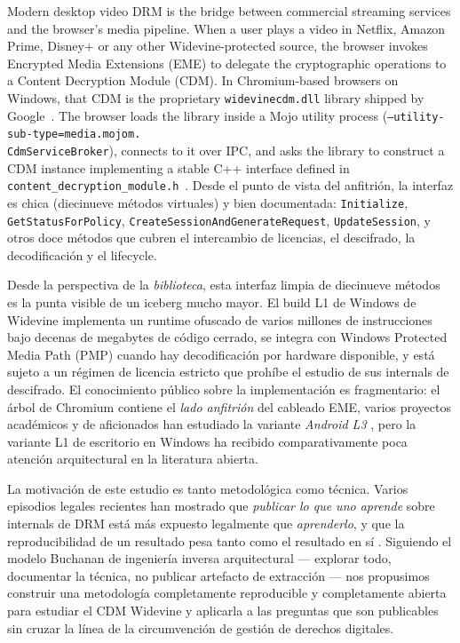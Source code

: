 \documentclass[11pt,letterpaper]{article}
\begin{document}
Modern desktop video DRM is the bridge between commercial streaming
services and the browser's media pipeline. When a user plays a video
in Netflix, Amazon Prime, Disney+ or any other Widevine-protected
source, the browser invokes Encrypted Media Extensions (EME) to
delegate the cryptographic operations to a Content Decryption Module
(CDM). In Chromium-based browsers on Windows, that CDM is the
proprietary \texttt{widevinecdm.dll} library shipped by
Google~\cite{widevine-spec}. The browser loads the library inside a
Mojo utility process
(\texttt{--utility-sub-type=media.mojom.\\CdmServiceBroker}), connects
to it over IPC, and asks the library to construct a CDM instance
implementing a stable C++ interface defined in
\texttt{content\_decryption\_module.h}~\cite{chromium-cdm-api}.
Desde el punto de vista del anfitrión, la interfaz es chica
(diecinueve métodos virtuales) y bien documentada:
\texttt{Initialize}, \texttt{GetStatusForPolicy},
\texttt{CreateSessionAndGenerateRequest},
\texttt{UpdateSession}, y otros doce métodos que cubren el
intercambio de licencias, el descifrado, la decodificación y el
lifecycle.

Desde la perspectiva de la \emph{biblioteca}, esta interfaz limpia
de diecinueve métodos es la punta visible de un iceberg mucho
mayor. El build L1 de Windows de Widevine implementa un runtime
ofuscado de varios millones de instrucciones bajo decenas de
megabytes de código cerrado, se integra con Windows Protected
Media Path (PMP) cuando hay decodificación por hardware
disponible, y está sujeto a un régimen de licencia estricto que
prohíbe el estudio de sus internals de descifrado. El conocimiento
público sobre la implementación es fragmentario: el árbol de
Chromium contiene el \emph{lado anfitrión} del cableado EME,
varios proyectos académicos y de aficionados han estudiado la
variante \emph{Android L3} \cite{quarkslab-widevine,
l3-decryptor}, pero la variante L1 de escritorio en Windows ha
recibido comparativamente poca atención arquitectural en la
literatura abierta.

La motivación de este estudio es tanto metodológica como técnica.
Varios episodios legales recientes han mostrado que
\emph{publicar lo que uno aprende} sobre internals de DRM está más
expuesto legalmente que \emph{aprenderlo}, y que la
reproducibilidad de un resultado pesa tanto como el resultado en
sí \cite{sklyarov-case, dvdjon-norway, hadad-case}. Siguiendo el
modelo Buchanan de ingeniería inversa arquitectural
\cite{buchanan-blog, buchanan-imessage} --- explorar todo,
documentar la técnica, no publicar artefacto de extracción ---
nos propusimos construir una metodología completamente
reproducible y completamente abierta para estudiar el CDM
Widevine y aplicarla a las preguntas que son publicables sin
cruzar la línea de la circumvención de gestión de derechos
digitales.
\end{document}
